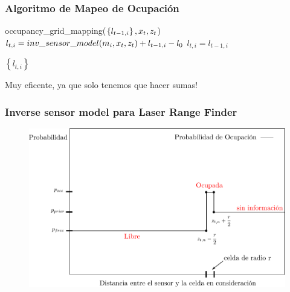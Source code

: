 \begin{frame}
    \frametitle{Algoritmo de Mapeo de Ocupación}
    
   \begin{algorithmic}[1]
       \State occupancy\_grid\_mapping($\left\lbrace l_{t-1,i} \right\rbrace, x_{t}, z_{t}$)
            \State $l_{t,i} = inv\_sensor\_model(m_{i}, x_{t}, z_{t}) + l_{t-1,i} - l_{0}$
       \Else
       \State $l_{t,i} = l_{t-1,i}$
       \EndIf
       \EndFor
       
       \State \Return $\left\lbrace l_{t,i} \right\rbrace$
   \end{algorithmic}
    Muy eficente, ya que solo tenemos que hacer sumas!

\end{frame}

\begin{frame}
    \frametitle{Inverse sensor model para Laser Range Finder}
    
   	\begin{figure}[!h]
        \includegraphics[width=0.8\columnwidth]{./images/inverse_senor_model_range_finder.pdf}
    \end{figure}
    
\end{frame}

